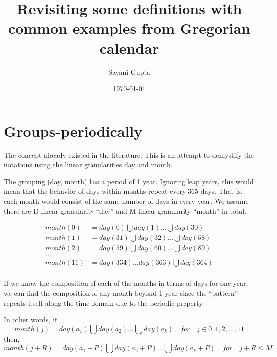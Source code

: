 \documentclass[10pt,a4paper,]{article}
\title{Revisiting some definitions with common examples from Gregorian calendar}
\author{Sayani Gupta}
\date{\today}
\newenvironment{fminipage}%
{\begin{Sbox}\begin{minipage}{\textwidth}}%
{\end{minipage}\end{Sbox}\colorbox[gray]{0.8}{\TheSbox}}
\begin{document}
\vspace*{-2cm}
\begin{fminipage}\sffamily
\maketitle
\end{fminipage}\vspace*{0.5cm}


\hypertarget{groups-periodically}{%
\section{Groups-periodically}\label{groups-periodically}}

The concept already existed in the literature. This is an attempt to demystify the notations using the linear granularities day and month.

The grouping (day, month) has a period of 1 year. Ignoring leap years, this would mean that the behavior of days within months repeat every 365 days. That is, each month would consist of the same number of days in every year. We assume there are D linear granularity \enquote{day} and M linear granularity \enquote{month} in total.

\begin{equation}\label{eq:eq1}
\begin{split}
month(0) & = day(0)\bigcup day(1)\dots\bigcup day(30)\\
month(1) & = day(31)\bigcup day(32)\dots\bigcup day(58)\\
month(2) & = day(59)\bigcup day(60)\dots\bigcup day(89)\\
\dots\\
month(11) & = day(334)\dots day(363)\bigcup day(364)\\
\end{split}
\end{equation}

If we know the composition of each of the months in terms of days for one year, we can find the composition of any month beyond 1 year since the \enquote{pattern} repeats itself along the time domain due to the periodic property.

In other words, if
\begin{equation}\label{eq:eq2}
month(j) = day(a_1)\bigcup day(a_2)\dots\bigcup day(a_k) \quad for \quad j \in {0,1, 2, \dots, 11}
\end{equation}
then,\\
\begin{equation}
month(j + R) = day(a_1 + P)\bigcup day(a_2 + P)\dots\bigcup day(a_k + P) \quad for \quad j + R \leq M
\end{equation}
\end{document}
